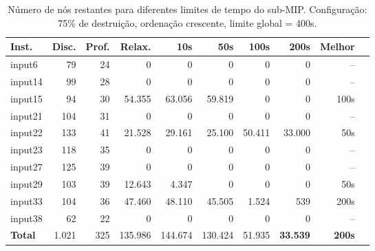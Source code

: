\begin{table}[htbp]
\centering
\caption{Número de nós restantes para diferentes limites de tempo do sub-MIP. Configuração: 75\% de destruição, ordenação crescente, limite global = 400s.}
\label{tab:lns_time_nodes}
\small
\begin{tabular}{@{}lrrrrrrrrr@{}}
\toprule
\textbf{Inst.} & \textbf{Disc.} & \textbf{Prof.} & \textbf{Relax.} & \textbf{10s} & \textbf{50s} & \textbf{100s} & \textbf{200s} & \textbf{Melhor} \\
\midrule
input6  & 79  & 24 & 0      & 0      & 0      & 0      & 0      & -- \\
input14 & 99  & 28 & 0      & 0      & 0      & 0      & 0      & -- \\
input15 & 94  & 30 & 54.355 & 63.056 & 59.819 & 0      & 0      & 100s \\
input21 & 104 & 31 & 0      & 0      & 0      & 0      & 0      & -- \\
input22 & 133 & 41 & 21.528 & 29.161 & 25.100 & 50.411 & 33.000 & 50s \\
input23 & 118 & 35 & 0      & 0      & 0      & 0      & 0      & -- \\
input27 & 125 & 39 & 0      & 0      & 0      & 0      & 0      & -- \\
input29 & 103 & 39 & 12.643 & 4.347  & 0      & 0      & 0      & 50s \\
input33 & 104 & 36 & 47.460 & 48.110 & 45.505 & 1.524  & 539 & 200s \\
input38 & 62  & 22 & 0      & 0      & 0      & 0      & 0      & -- \\
\midrule
\textbf{Total} & 1.021 & 325 & 135.986 & 144.674 & 130.424 & 51.935 & \textbf{33.539} & \textbf{200s} \\
\bottomrule
\end{tabular}
\end{table}

